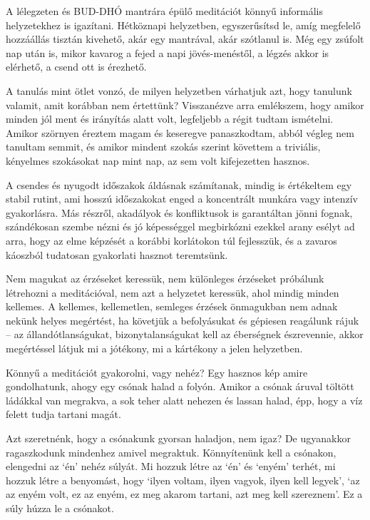 A lélegzeten és BUD-DHÓ mantrára épülő meditációt könnyű informális
helyzetekhez is igazítani. Hétköznapi helyzetben, egyszerűsítsd le, amíg
megfelelő hozzáállás tisztán kivehető, akár egy mantrával, akár
szótlanul is. Még egy zsúfolt nap után is, mikor kavarog a fejed a napi
jövés-menéstől, a légzés akkor is elérhető, a csend ott is érezhető.

A tanulás mint ötlet vonzó, de milyen helyzetben várhatjuk azt, hogy
tanulunk valamit, amit korábban nem értettünk? Visszanézve arra
emlékszem, hogy amikor minden jól ment és irányítás alatt volt,
legfeljebb a régit tudtam ismételni. Amikor szörnyen éreztem magam és
keseregve panaszkodtam, abból végleg nem tanultam semmit, és amikor
mindent szokás szerint követtem a triviális, kényelmes szokásokat nap
mint nap, az sem volt kifejezetten hasznos.

A csendes és nyugodt időszakok áldásnak számítanak, mindig is értékeltem
egy stabil rutint, ami hosszú időszakokat enged a koncentrált munkára
vagy intenzív gyakorlásra. Más részről, akadályok és konfliktusok is
garantáltan jönni fognak, szándékosan szembe nézni és jó képességgel
megbirkózni ezekkel arany esélyt ad arra, hogy az elme képzését a
korábbi korlátokon túl fejlesszük, és a zavaros káoszból tudatosan
gyakorlati hasznot teremtsünk.

Nem magukat az érzéseket keressük, nem különleges érzéseket próbálunk
létrehozni a meditációval, nem azt a helyzetet keressük, ahol mindig
minden kellemes. A kellemes, kellemetlen, semleges érzések önmagukban
nem adnak nekünk helyes megértést, ha követjük a befolyásukat és
gépiesen reagálunk rájuk -- az állandótlanságukat, bizonytalanságukat
kell az éberségnek észrevennie, akkor megértéssel látjuk mi a jótékony,
mi a kártékony a jelen helyzetben.

Könnyű a meditációt gyakorolni, vagy nehéz? Egy hasznos kép amire
gondolhatunk, ahogy egy csónak halad a folyón. Amikor a csónak áruval
töltött ládákkal van megrakva, a sok teher alatt nehezen és lassan
halad, épp, hogy a víz felett tudja tartani magát.

Azt szeretnénk, hogy a csónakunk gyorsan haladjon, nem igaz? De
ugyanakkor ragaszkodunk mindenhez amivel megraktuk. Könnyítenünk kell a
csónakon, elengedni az `én' nehéz súlyát. Mi hozzuk létre az `én' és
`enyém' terhét, mi hozzuk létre a benyomást, hogy `ilyen voltam, ilyen
vagyok, ilyen kell legyek', `az az enyém volt, ez az enyém, ez meg
akarom tartani, azt meg kell szereznem'. Ez a súly húzza le a csónakot.

